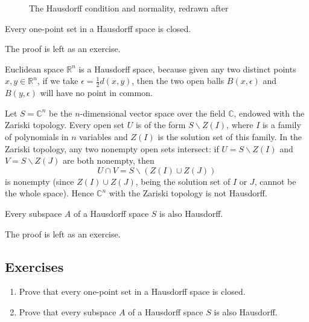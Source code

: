 \begin{figure}[htbp]
	\centering
	\caption{The Hausdorff condition and normality, redrawn after
		\cite{tu_introduction_2011}}
	\label{fig:hausdorff_cond}
\end{figure}



\begin{proposition}
	Every one-point set in a Hausdorff space is closed.
\end{proposition}

The proof is left as an exercise.

\begin{example}
	Euclidean space $\mathbb{R}^n$ is a Hausdorff space, because given any
	two distinct points $x,y\in\mathbb{R}^n$, if we take $\epsilon =
		\frac12 d(x,y)$, then the two open balls $B(x,\epsilon)$ and
	$B(y,\epsilon)$ will have no point in common.
\end{example}


\begin{example}
	Let $S = \mathbb{C}^n$ be the $n$-dimensional vector space over the
	field $\mathbb{C}$, endowed with the Zariski topology. Every open set
	$U$ is of the form $S\smallsetminus Z(I)$, where $I$ is a family of
	polynomials in $n$ variables and $Z(I)$ is the solution set of this
	family. In the Zariski topology, any two nonempty open sets intersect:
	if $U= S\smallsetminus Z(I)$ and $V = S\smallsetminus Z(J)$ are both
	nonempty, then
	\begin{displaymath}
		U\cap V = S\smallsetminus (Z(I)\cup Z(J))
	\end{displaymath}
	is nonempty (since $Z(I) \cup Z(J)$, being the solution set of $I$ or
	$J$, cannot be the whole space). Hence $\mathbb{C}^n$ with the Zariski
	topology is not Hausdorff.
\end{example}


\begin{proposition} Every subspace $A$ of a Hausdorff space $S$ is also
	Hausdorff.

\end{proposition}

The proof is left as an exercise.

\subsection{Exercises} \label{exsec:seperable}

\begin{enumerate}
	\item Prove that every one-point set in a Hausdorff space is closed.
	\item Prove that every subspace $A$ of a Hausdorff space $S$ is also
	      Hausdorff.
\end{enumerate}





